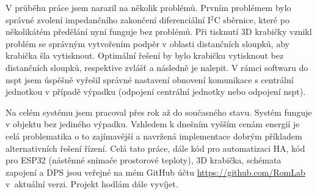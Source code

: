 V průběhu práce jsem narazil na několik problémů. Prvním problémem bylo správné zvolení impedančního zakončení diferenciální I$^{2}$C sběrnice, které po několikátém předělání nyní funguje bez problémů. Při tisknutí 3D krabičky vznikl problém se správným vytvořením podpěr v oblasti distančních sloupků, aby krabička šla vytisknout. Optimální řešení by bylo krabičku vytisknout bez distančních sloupků, respektive zvlášť a následně je nalepit. V rámci softwaru do \acrshort{nspt} jsem úspěšně vyřešil správné nastavení obnovení komunikace s centrální jednotkou v případě výpadku (odpojení centrální jednotky nebo odpojení \acrshort{nspt}).

Na celém systému jsem pracoval přes rok až do současného stavu. Systém funguje v objektu bez jediného výpadku. Vzhledem k dnešním vyšším cenám energií je celá problematika o to zajímavější a navržená implementace dobrým příkladem alternativních řešení řízení. Celá tato práce, dále kód pro automatizaci HA, kód pro ESP32 (nástěnné snímače prostorové teploty), 3D krabička, schémata zapojení a DPS jsou veřejné na mém GitHub účtu \mbox{\url{https://github.com/RomLab}} v~aktuální verzi. Projekt hodlám dále vyvíjet.

